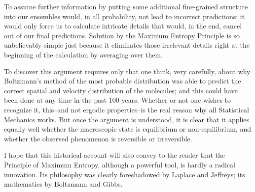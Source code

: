 To assume further information by putting some additional fine-grained structure into our ensembles would, in all probability, not lead to incorrect predictions; it would only
force us to calculate intricate details that would, in the end, cancel out of our final predictions.
Solution by the Maximum Entropy Principle is so unbelievably simple just because it eliminates those irrelevant details right at the beginning of the calculation by averaging over them.

To discover this argument requires only that one think, very carefully, about why Boltzmann's method of the most probable distribution was able to predict the correct spatial and velocity distribution of the molecules; and this could have been done at any time in the past 100 years.
Whether or not one wishes to recognize it, this--and not ergodic properties--is the real reason why all Statistical Mechanics works.
But once the argument is understood, it is clear that it applies equally well whether the macroscopic state is equilibrium or non-equilibrium, and whether the observed phenomenon is reversible or irreversible.

I hope that this historical account will also convey to the reader that the Principle of Maximum Entropy, although a powerful tool, is hardly a radical innovation.
Its philosophy was clearly foreshadowed by Laplace and Jeffreys; its mathematics by Boltzmann and Gibbs.